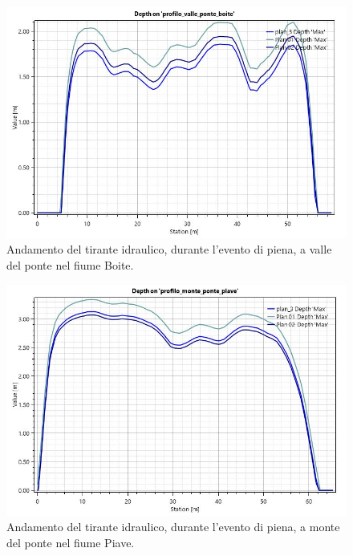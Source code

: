 \begin{figure}[H] \centering
    \includegraphics[scale=0.5]{immagini/depth_valle_ponte_boite.JPG}
    \caption{Andamento del tirante idraulico, durante l'evento di piena, a valle del ponte nel fiume Boite.}
    \label{figure:depth_valle_ponte_boite}
\end{figure}

\begin{figure}[H] \centering
    \includegraphics[scale=0.5]{immagini/depth_monte_ponte_piave.JPG}
    \caption{Andamento del tirante idraulico, durante l'evento di piena, a monte del ponte nel fiume Piave.}
    \label{figure:depth_monte_ponte_piave}
\end{figure}

